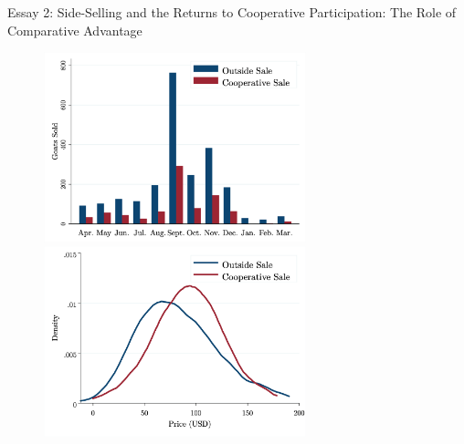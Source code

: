 \documentclass[aspectratio=169]{beamer}
\begin{document}
\begin{frame}{Essay 2: Side-Selling and the Returns to Cooperative Participation: The Role of Comparative Advantage}
\begin{figure}[!h]
  \label{fig:app}
  \hspace{-1.2cm}
  \begin{minipage}{.45\textwidth}
    \includegraphics[width=7.6cm,trim=4 4 4 4,clip]{E2_SaleMonth.png}
  \end{minipage}
  \hspace{.5cm}
  \begin{minipage}{.45\textwidth}
  \vspace{.45cm}
    \includegraphics[width=7.6cm,trim=4 4 4 4,clip]{E2_PriceDensity_Annual.png}
  \end{minipage}
\end{figure}
\end{frame}
\end{document}

